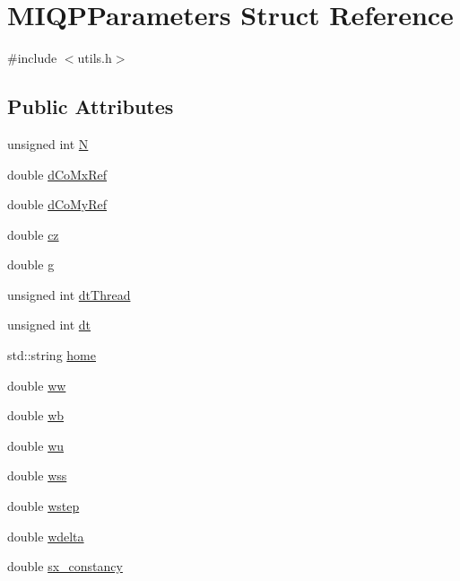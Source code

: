 \hypertarget{structMIQPParameters}{\section{\-M\-I\-Q\-P\-Parameters \-Struct \-Reference}
\label{structMIQPParameters}
}


{\ttfamily \#include $<$utils.\-h$>$}

\subsection*{\-Public \-Attributes}
\begin{DoxyCompactItemize}
\item 
unsigned int \hyperlink{structMIQPParameters_a7545bc29708292cbfca22b0446180f7c}{\-N}
\item 
double \hyperlink{structMIQPParameters_adcf11681372ec3391e6a787a41311de6}{d\-Co\-Mx\-Ref}
\item 
double \hyperlink{structMIQPParameters_aa46f73654acd8d31215690a6782f7d21}{d\-Co\-My\-Ref}
\item 
double \hyperlink{structMIQPParameters_ab8158e2bf119d70c9856b6a277e3c42a}{cz}
\item 
double \hyperlink{structMIQPParameters_a31eca71d200b5b1468bd60b3266d0688}{g}
\item 
unsigned int \hyperlink{structMIQPParameters_a7f5403de83b908d6ce34ce41a1327d62}{dt\-Thread}
\item 
unsigned int \hyperlink{structMIQPParameters_ab4fca30503423e047dc55d27f0c9f3c9}{dt}
\item 
std\-::string \hyperlink{structMIQPParameters_a351843e2933021d2ed3abb00a9d001ff}{home}
\item 
double \hyperlink{structMIQPParameters_a7223a1cda1e4565d18729f1e7bba87e0}{ww}
\item 
double \hyperlink{structMIQPParameters_a6bc828e6060bfd69c3d6353a460de86b}{wb}
\item 
double \hyperlink{structMIQPParameters_aed141afdcc25904d53526a5f2c977427}{wu}
\item 
double \hyperlink{structMIQPParameters_a317395e51ff98506316b9a63cf03d48f}{wss}
\item 
double \hyperlink{structMIQPParameters_a284df9b565513a826e92098f0a23f5cc}{wstep}
\item 
double \hyperlink{structMIQPParameters_ac13ff21321154d5cebba21855ac8357f}{wdelta}
\item 
double \hyperlink{structMIQPParameters_ae7f08901a6a4bd6850cf232496d1c231}{sx\-\_\-constancy}

\end{DoxyCompactItemize}
